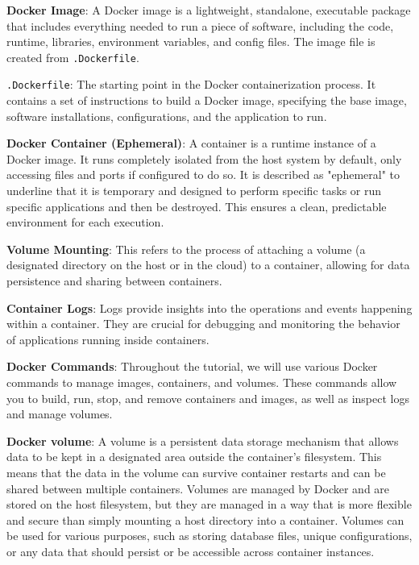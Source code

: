 \documentclass{article}
\begin{document}
\begin{description}
    \item \textbf{Docker Image}: A Docker image is a lightweight, standalone, executable package that includes everything needed to run a piece of software, including the code, runtime, libraries, environment variables, and config files. The image file is created from \texttt{.Dockerfile}.
    \item \texttt{.Dockerfile}: The starting point in the Docker containerization process. It contains a set of instructions to build a Docker image, specifying the base image, software installations, configurations, and the application to run.
    \item \textbf{Docker Container (Ephemeral)}: A container is a runtime instance of a Docker image. It runs completely isolated from the host system by default, only accessing files and ports if configured to do so.  It is described as "ephemeral" to underline that it is temporary and designed to perform specific tasks or run specific applications and then be destroyed. This ensures a clean, predictable environment for each execution.
    \item \textbf{Volume Mounting}: This refers to the process of attaching a volume (a designated directory on the host or in the cloud) to a container, allowing for data persistence and sharing between containers.
    \item \textbf{Container Logs}: Logs provide insights into the operations and events happening within a container. They are crucial for debugging and monitoring the behavior of applications running inside containers.
    \item \textbf{Docker Commands}: Throughout the tutorial, we will use various Docker commands to manage images, containers, and volumes. These commands allow you to build, run, stop, and remove containers and images, as well as inspect logs and manage volumes.
    \item \textbf{Docker volume}: A volume is a persistent data storage mechanism that allows data to be kept in a designated area outside the container's filesystem. This means that the data in the volume can survive container restarts and can be shared between multiple containers. Volumes are managed by Docker and are stored on the host filesystem, but they are managed in a way that is more flexible and secure than simply mounting a host directory into a container. Volumes can be used for various purposes, such as storing database files, unique configurations, or any data that should persist or be accessible across container instances.

\end{description}
\end{document}
